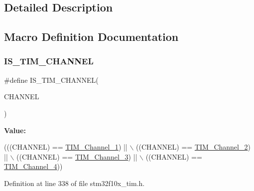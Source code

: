 \subsection{Detailed Description}


\subsection{Macro Definition Documentation}
\mbox{\label{group___t_i_m___channel_gae9721e3731e5fd983c83a9c1d32ef03d}} 
\subsubsection{\texorpdfstring{I\+S\+\_\+\+T\+I\+M\+\_\+\+C\+H\+A\+N\+N\+EL}{IS\_TIM\_CHANNEL}}
{\footnotesize\ttfamily \#define I\+S\+\_\+\+T\+I\+M\+\_\+\+C\+H\+A\+N\+N\+EL(\begin{DoxyParamCaption}\item[{}]{C\+H\+A\+N\+N\+EL }\end{DoxyParamCaption})}

{\bfseries Value\+:}
\begin{DoxyCode}
(((CHANNEL) == \hyperlink{group___t_i_m___channel_ga69ea7f558f02c63dd1082d784d2449bd}{TIM\_Channel\_1}) || \(\backslash\)
                                 ((CHANNEL) == \hyperlink{group___t_i_m___channel_ga03d7da8269a87a560f68985b4bd80931}{TIM\_Channel\_2}) || \(\backslash\)
                                 ((CHANNEL) == \hyperlink{group___t_i_m___channel_ga012711b19e8c91f6f352801a3dc0bcc9}{TIM\_Channel\_3}) || \(\backslash\)
                                 ((CHANNEL) == \hyperlink{group___t_i_m___channel_ga7414888c40d066af235bc1f80b99bd9d}{TIM\_Channel\_4}))
\end{DoxyCode}


Definition at line 338 of file stm32f10x\+\_\+tim.\+h.

\mbox{\label{group___t_i_m___channel_ga6f44459b7dfc4138bbc2c3795311c48c}} 
